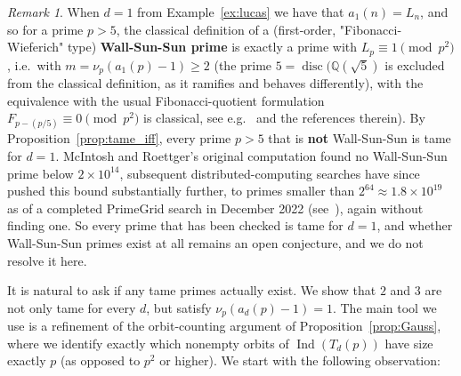 \documentclass{article}
\theoremstyle{plain}
\theoremstyle{definition}
\theoremstyle{remark}
\newtheorem{remark}[theorem]{Remark}
\newcommand{\Q}{\mathbb{Q}}
\DeclareMathOperator{\Ind}{Ind}
\begin{document}
\begin{remark}\label{rem:WSS}
When $d=1$ from Example~\ref{ex:lucas} we have that $a_1(n)=L_n$, and so for a prime $p>5$, the classical definition of a (first-order, "Fibonacci-Wieferich" type) \textbf{Wall-Sun-Sun prime} is exactly a prime with $L_p\equiv1\pmod{p^2}$, i.e.\ with $m=\nu_p(a_1(p)-1)\ge2$ (the prime $5=\operatorname{disc}(\Q(\sqrt5)$ is excluded from the classical definition, as it ramifies and behaves differently), with the equivalence with the usual Fibonacci-quotient formulation $F_{p-(p/5)}\equiv0\pmod{p^2}$ is classical, see e.g.\ \cite{McIntoshRoettger} and the references therein). By Proposition~\ref{prop:tame_iff}, every prime $p> 5$ that is \textbf{not} Wall-Sun-Sun is tame for $d=1$. McIntosh and Roettger's original computation \cite{McIntoshRoettger} found no Wall-Sun-Sun prime below $2\times10^{14}$, subsequent distributed-computing searches have since pushed this bound substantially further, to primes smaller than $2^{64}\approx1.8\times10^{19}$ as of a completed PrimeGrid search in December 2022 (see~\cite{PrimeGrid}), again without finding one. So every prime that has been checked is tame for $d=1$, and whether Wall-Sun-Sun primes exist at all remains an open conjecture, and we do not resolve it here.
\end{remark}





It is natural to ask if any tame primes actually exist. We show that $2$ and $3$ are not only tame for every $d$, but satisfy 
$\nu_p(a_d(p)-1)=1$. The main tool we use is a refinement of the orbit-counting argument of Proposition~\ref{prop:Gauss}, where we identify exactly which nonempty orbits of $\Ind(T_d(p))$ have size exactly $p$ (as opposed to $p^2$ or higher). We start with the following observation:
\end{document}
